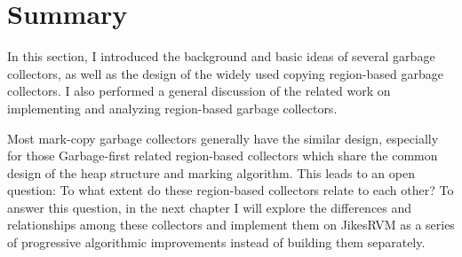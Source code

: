 \section{Summary}

In this section, I introduced the background and basic ideas of several garbage collectors,
as well as the design of the widely used copying region-based garbage collectors.
I also performed a general discussion of the related work on implementing and analyzing region-based garbage collectors.

Most mark-copy garbage collectors generally have the similar design, especially for those
Garbage-first related region-based collectors which share the common design of the heap structure and
marking algorithm.
This leads to an open question: To what extent do these region-based collectors
relate to each other? To answer this question, in the next chapter I will explore the
differences and relationships among these collectors and implement them on JikesRVM
as a series of progressive algorithmic improvements instead of building them separately.
